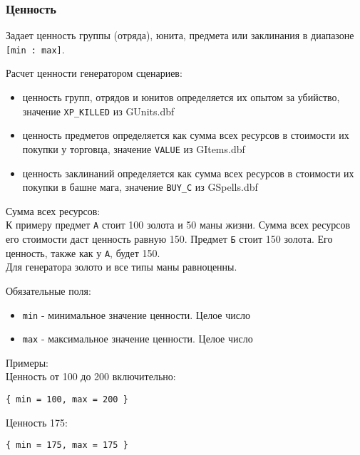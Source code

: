 \subsubsection{Ценность}
\label{value}
Задает ценность группы (отряда), юнита, предмета или заклинания в диапазоне \texttt{[min : max]}.

Расчет ценности генератором сценариев:
\begin{itemize}
\item ценность групп, отрядов и юнитов определяется их опытом за убийство, значение \texttt{XP\_KILLED} из GUnits.dbf
\item ценность предметов определяется как сумма всех ресурсов в стоимости их покупки у торговца, значение \texttt{VALUE} из GItems.dbf
\item ценность заклинаний определяется как сумма всех ресурсов в стоимости их покупки в башне мага, значение \texttt{BUY\_C} из GSpells.dbf
\end{itemize}

Сумма всех ресурсов:\\
К примеру предмет \texttt{А} стоит 100 золота и 50 маны жизни. Сумма всех ресурсов его стоимости даст ценность равную 150.
Предмет \texttt{Б} стоит 150 золота. Его ценность, также как у \texttt{А}, будет 150.\\
Для генератора золото и все типы маны равноценны.

Обязательные поля:
\begin{itemize}
\item \texttt{min} - минимальное значение ценности. Целое число
\item \texttt{max} - максимальное значение ценности. Целое число
\end{itemize}

Примеры:\\
Ценность от 100 до 200 включительно:\\
\begin{lstlisting}
{ min = 100, max = 200 }
\end{lstlisting}
Ценность 175:\\
\begin{lstlisting}
{ min = 175, max = 175 }
\end{lstlisting}